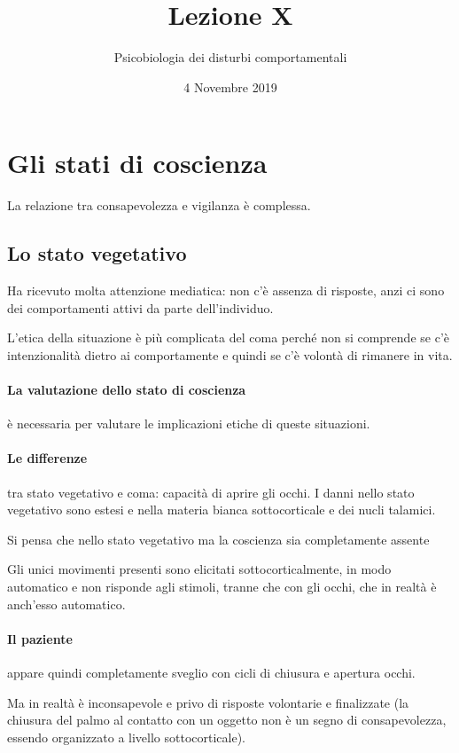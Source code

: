 \documentclass[12pt, a4paper]{article}
\date{4 Novembre 2019}
\title{Lezione X}
\author{Psicobiologia dei disturbi comportamentali}
\begin{document}
\maketitle

\section{Gli stati di coscienza}

La relazione tra consapevolezza e vigilanza \`e complessa.

\subsection{Lo stato vegetativo}

Ha ricevuto molta attenzione mediatica: non c'\`e assenza di risposte, anzi ci sono dei comportamenti attivi da parte dell'individuo.

L'etica della situazione \`e pi\`u complicata del coma perch\'e non si comprende se c'\`e intenzionalit\`a dietro ai comportamente e quindi se c'\`e volont\`a di rimanere in vita.


\paragraph{La valutazione dello stato di coscienza} \`e necessaria per valutare le implicazioni etiche di queste situazioni.

\paragraph{Le differenze} tra stato vegetativo e coma: capacit\`a di aprire gli occhi. I danni nello stato vegetativo sono estesi e nella materia bianca sottocorticale e dei nucli talamici.

Si pensa che nello stato vegetativo ma la coscienza sia completamente assente

Gli unici movimenti presenti sono elicitati sottocorticalmente, in modo automatico e non risponde agli stimoli, tranne che con gli occhi, che in realt\`a \`e anch'esso automatico.

\paragraph{Il paziente} appare quindi completamente sveglio con cicli di chiusura e apertura occhi.

Ma in realt\`a \`e inconsapevole e privo di risposte volontarie e finalizzate (la chiusura del palmo al contatto con un oggetto non \`e un segno di consapevolezza, essendo organizzato a livello sottocorticale).
\end{document}
